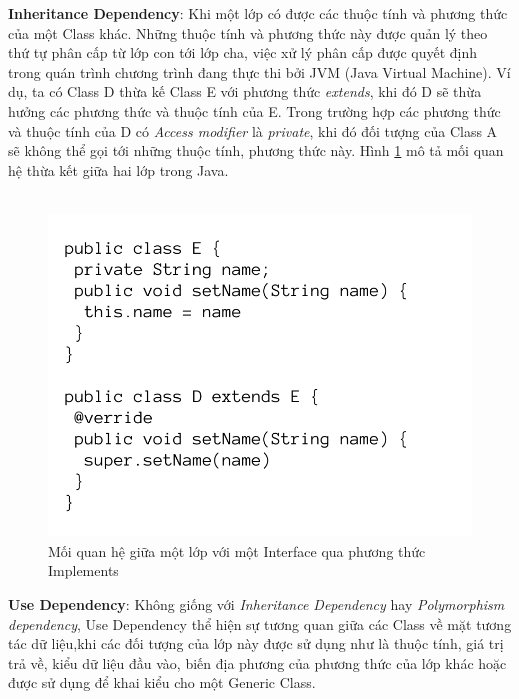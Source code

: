 \documentclass[12pt]{report}
\begin{document}
\newpage
\noindent \textbf{Inheritance Dependency}: Khi một lớp có được các thuộc tính và phương thức của một Class khác. Những thuộc tính và phương thức này được quản lý theo thứ tự phân cấp từ lớp con tới lớp cha, việc xử lý phân cấp được quyết định trong quán trình chương trình đang thực thi bởi JVM (Java Virtual Machine). Ví dụ, ta có Class D thừa kế Class E với phương thức \textit{extends}, khi đó D sẽ thừa hưởng các phương thức và thuộc tính của E. Trong trường hợp các phương thức và thuộc tính của D có \textit{Access modifier} là \textit{private}, khi đó đối tượng của Class A sẽ không thể gọi tới những thuộc tính, phương thức này. Hình \ref{fig:D_extends_E} mô tả mối quan hệ thừa kết giữa hai lớp trong Java.\\\\
\begin{figure}[!htbp]
	\centering
	\vspace{-1.5cm}
	\includegraphics[scale=0.35]{images/D_extends_E}
	\caption{Mối quan hệ giữa một lớp với một Interface qua phương thức Implements}
	\label{fig:D_extends_E}
\end{figure}

\noindent \textbf{Use Dependency}: Không giống với \textit{Inheritance Dependency} hay \textit{Polymorphism dependency}, Use Dependency thể hiện sự tương quan giữa các Class về mặt tương tác dữ liệu,khi các đối tượng của lớp này được sử dụng như là thuộc tính, giá trị trả về, kiểu dữ liệu đầu vào, biến địa phương của phương thức của lớp khác hoặc được sử dụng để khai kiểu cho một Generic Class.
\end{document}
